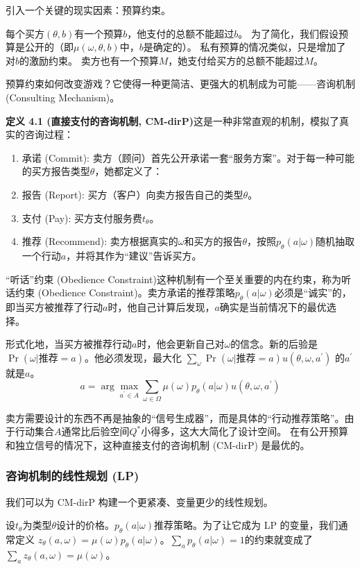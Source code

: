 引入一个关键的现实因素：预算约束。

每个买方$(\theta,b)$有一个预算$b$，他支付的总额不能超过$b$。
为了简化，我们假设预算是公开的（即$\mu(\omega,\theta,b)$中，$b$是确定的）。
私有预算的情况类似，只是增加了对$b$的激励约束。
卖方也有一个预算$M$，她支付给买方的总额不能超过$M$。

预算约束如何改变游戏？它使得一种更简洁、更强大的机制成为可能——咨询机制 (Consulting Mechanism)。

\textbf{定义 4.1 (直接支付的咨询机制, CM-dirP)}这是一种非常直观的机制，模拟了真实的咨询过程：

\begin{enumerate}
    \item 承诺 (Commit): 卖方（顾问）首先公开承诺一套“服务方案”。对于每一种可能的买方报告类型$\theta$，她都定义了：
    \item 报告 (Report): 买方（客户）向卖方报告自己的类型$\theta$。
    \item 支付 (Pay): 买方支付服务费$t_\theta$。
    \item 推荐 (Recommend): 卖方根据真实的$\omega$和买方的报告$\theta$，按照$p_\theta (a|\omega)$随机抽取一个行动$a$，并将其作为“建议”告诉买方。
\end{enumerate}

“听话”约束 (Obedience Constraint)这种机制有一个至关重要的内在约束，称为听话约束 (Obedience Constraint)。卖方承诺的推荐策略$p_\theta (a|\omega)$必须是“诚实”的，
即当买方被推荐了行动$a$时，他自己计算后发现，$a$确实是当前情况下的最优选择。

形式化地，当买方被推荐行动$a$时，他会更新自己对$\omega$的信念。新的后验是$\Pr(\omega|\text{推荐}=a)$。他必须发现，最大化
 $\sum\limits_{\omega}\Pr(\omega | \text{推荐}=a)u(\theta,\omega,a^\prime)$ 的$a^\prime$就是$a$。
$$a = \arg \max_{a^\prime \in A}\sum\limits_{\omega\in\Omega}\mu(\omega)p_{\theta}(a|\omega)u(\theta,\omega,a^\prime)$$

卖方需要设计的东西不再是抽象的“信号生成器”，而是具体的“行动推荐策略”。由于行动集合$A$通常比后验空间$Q^\ast$小得多，这大大简化了设计空间。
在有公开预算和独立信号的情况下，这种直接支付的咨询机制 (CM-dirP) 是最优的。

\subsubsection{咨询机制的线性规划 (LP)}

我们可以为 CM-dirP 构建一个更紧凑、变量更少的线性规划。

设$t_\theta$为类型$\theta$设计的价格。$p_\theta (a|\omega)$推荐策略。为了让它成为 LP 的变量，我们通常定义
$z_\theta (a,\omega)=\mu(\omega)p_\theta (a|\omega)$。$\sum\limits_{a}p_\theta(a|\omega)=1$的约束就变成了$\sum\limits_{a} z_\theta(a,\omega)=\mu(\omega)$。

